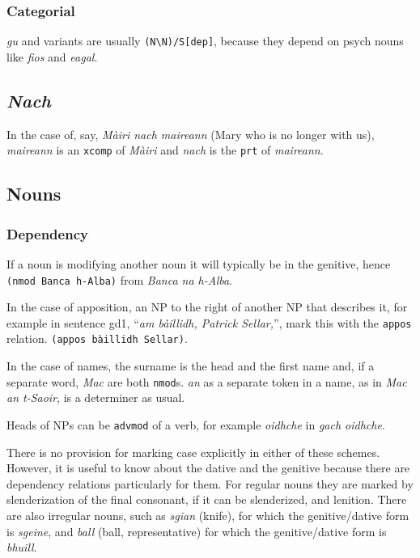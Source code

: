 \documentclass[a4paper]{article}
\begin{document}
\subsubsection{Categorial}
 \textit{gu} and variants are usually \texttt{(N\textbackslash N)/S[dep]}, because they depend on psych nouns like \textit{fios} and \textit{eagal}.

\subsection{\textit{Nach}}

 In the case of, say, \textit{M\`airi nach maireann} (Mary who is no longer with us), \textit{maireann} is an \texttt{xcomp} of \textit{M\`airi} and \textit{nach} is the \texttt{prt} of \textit{maireann}.


\subsection{Nouns}

\subsubsection{Dependency}
 If a noun is modifying another noun it will typically be in the genitive, hence \texttt{(nmod Banca h-Alba)} from \textit{Banca na h-Alba}.

 In the case of apposition, an NP to the right of another NP that describes it, for example in sentence gd1, ``\textit{am b\`aillidh, Patrick Sellar,}'', mark this with the \texttt{appos} relation. \texttt{(appos b\`aillidh Sellar)}. 

 In the case of names, the surname is the head and the first name and, if a separate word, \textit{Mac} are both \texttt{nmod}s. \textit{an} as a separate token in a name, as in \textit{Mac an t-Saoir}, is a determiner as usual.

 Heads of NPs can be \texttt{advmod} of a verb, for example \textit{oidhche} in \textit{gach oidhche}.

There is no provision for marking case explicitly in either of these schemes.
However, it is useful to know about the dative and the genitive because there are dependency relations particularly for them.
For regular nouns they are marked by slenderization of the final consonant, if it can be slenderized, and lenition.
There are also irregular nouns, such as \textit{sgian} (knife), for which the genitive/dative form is \textit{sgeine}, and \textit{ball} (ball, representative) for which the genitive/dative form is \textit{bhuill}.
\end{document}
